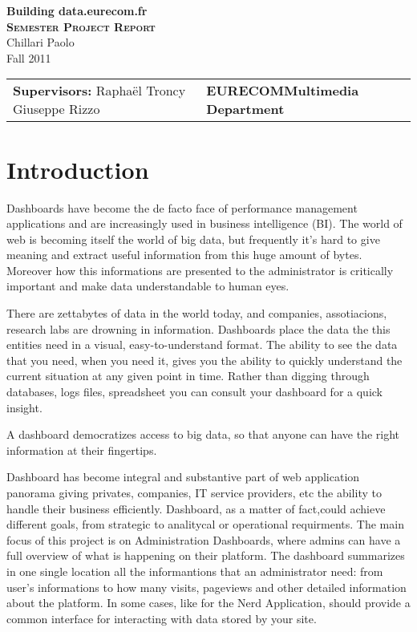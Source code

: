 \documentclass[a4paper,12pt]{report}
\begin{document}
\begin{titlepage}
\begin{center}
\textbf{\Huge{Building data.eurecom.fr}}
\\[2cm]
\textbf{\textsc{\LARGE{Semester Project Report}}}
\\[0.5cm]
\LARGE{Chillari Paolo}
\\
\large{Fall 2011}
\\[8cm]
\begin{tabular}{p{8cm} p{8.5cm}}
\small{\textbf{Supervisors:}\newline
Rapha\"el Troncy\newline
Giuseppe Rizzo} 
&\small{\textbf{EURECOM\newline Multimedia Department}}
\end{tabular}
\end{center}
\end{titlepage}

 \tableofcontents

\chapter*{Introduction}
Dashboards have become the de facto face of performance management applications and are increasingly used in business intelligence (BI). The world of web is becoming itself the world of big data, but frequently it's hard to give meaning and extract useful information from this huge amount of bytes. Moreover how this informations are presented to the administrator is critically important and make data understandable to human eyes.

There are zettabytes of data in the world today, and companies, assotiacions, research labs are drowning in information. Dashboards place the data the this entities need in a visual, easy-to-understand format. The ability to see the data that you need, when you need it, gives you the ability to quickly understand the current situation at any given point in time. Rather than digging through databases, logs files, spreadsheet you can consult your dashboard for a quick insight.

A dashboard democratizes access to big data, so that anyone  can have the right information at their fingertips.

Dashboard has become integral and substantive part of web application panorama giving privates, companies, IT service providers, etc the ability to handle their business efficiently. Dashboard, as a matter of fact,could achieve different goals, from strategic to analitycal or operational requirments.
The main focus of this project is on Administration Dashboards, where admins can have a full overview of what is happening on their platform. The dashboard summarizes in one single location all the informantions that an administrator need: from user's informations to how many visits, pageviews and other detailed information about the platform. In some cases, like for the Nerd Application, should provide a common interface for interacting with data stored by your site.
\end{document}
